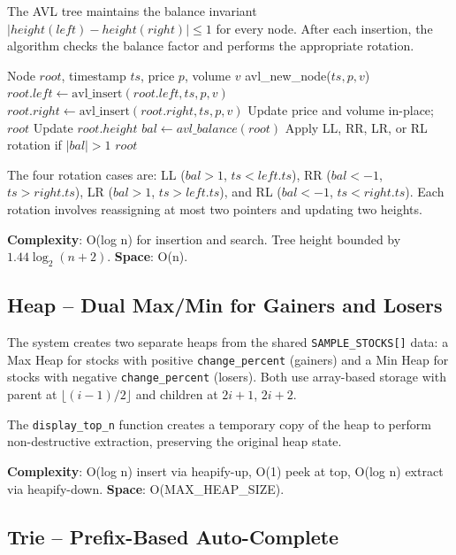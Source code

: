 \documentclass[conference]{IEEEtran}
\begin{document}
The AVL tree maintains the balance invariant $|height(left) - height(right)| \leq 1$ for every node. After each insertion, the algorithm checks the balance factor and performs the appropriate rotation.

\begin{algorithm}
\caption{AVL Tree Insertion (\texttt{avl\_insert})}
\begin{algorithmic}[1]
\REQUIRE Node $root$, timestamp $ts$, price $p$, volume $v$
  \RETURN avl\_new\_node($ts, p, v$)
\ENDIF
{}
  \STATE $root.left \gets \text{avl\_insert}(root.left, ts, p, v)$
  \STATE $root.right \gets \text{avl\_insert}(root.right, ts, p, v)$
\ELSE
  \STATE Update price and volume in-place; \RETURN $root$
\ENDIF
\STATE Update $root.height$
\STATE $bal \gets avl\_balance(root)$
\STATE Apply LL, RR, LR, or RL rotation if $|bal| > 1$
\RETURN $root$
\end{algorithmic}
\end{algorithm}

The four rotation cases are: LL ($bal>1$, $ts < left.ts$), RR ($bal<-1$, $ts > right.ts$), LR ($bal>1$, $ts > left.ts$), and RL ($bal<-1$, $ts < right.ts$). Each rotation involves reassigning at most two pointers and updating two heights.

\textbf{Complexity}: O(log n) for insertion and search. Tree height bounded by $1.44 \log_2(n+2)$. \textbf{Space}: O(n).

\subsection{Heap -- Dual Max/Min for Gainers and Losers}

The system creates two separate heaps from the shared \texttt{SAMPLE\_STOCKS[]} data: a Max Heap for stocks with positive \texttt{change\_percent} (gainers) and a Min Heap for stocks with negative \texttt{change\_percent} (losers). Both use array-based storage with parent at $\lfloor(i-1)/2\rfloor$ and children at $2i+1$, $2i+2$.

The \texttt{display\_top\_n} function creates a temporary copy of the heap to perform non-destructive extraction, preserving the original heap state.

\textbf{Complexity}: O(log n) insert via heapify-up, O(1) peek at top, O(log n) extract via heapify-down. \textbf{Space}: O(MAX\_HEAP\_SIZE).

\subsection{Trie -- Prefix-Based Auto-Complete}
\end{document}
